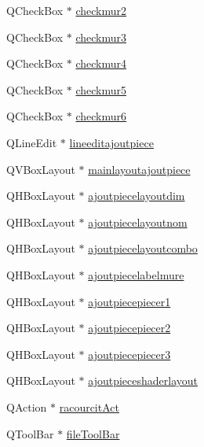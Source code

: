 \begin{DoxyCompactItemize}
\item 
Q\+Check\+Box $\ast$ \hyperlink{class_main_window_a9311b2ff986d09836c8e385348acd571}{checkmur2}
\item 
Q\+Check\+Box $\ast$ \hyperlink{class_main_window_a71169e71f8f50fc126c8cdaad981cad7}{checkmur3}
\item 
Q\+Check\+Box $\ast$ \hyperlink{class_main_window_a2e8fae74cfc9045da4dfcba506aacca4}{checkmur4}
\item 
Q\+Check\+Box $\ast$ \hyperlink{class_main_window_a13b9eb7874b1b8363eb8ee0399e0a6db}{checkmur5}
\item 
Q\+Check\+Box $\ast$ \hyperlink{class_main_window_a0e9dad3f68b376acacd166f6a58ea4dd}{checkmur6}
\item 
Q\+Line\+Edit $\ast$ \hyperlink{class_main_window_ac6b2333b54d4551f41d0941c7f171097}{lineeditajoutpiece}
\item 
Q\+V\+Box\+Layout $\ast$ \hyperlink{class_main_window_a9c7efc08e16b1648f53664b98dc99c00}{mainlayoutajoutpiece}
\item 
Q\+H\+Box\+Layout $\ast$ \hyperlink{class_main_window_ae06a728d54678994456d0585d265baf0}{ajoutpiecelayoutdim}
\item 
Q\+H\+Box\+Layout $\ast$ \hyperlink{class_main_window_a48cf0bbc5e90a751711519a7c7c2af7b}{ajoutpiecelayoutnom}
\item 
Q\+H\+Box\+Layout $\ast$ \hyperlink{class_main_window_a195ed8cd075a1153faa7926f38b08609}{ajoutpiecelayoutcombo}
\item 
Q\+H\+Box\+Layout $\ast$ \hyperlink{class_main_window_a7fc456fae07aba46102c8670721688e6}{ajoutpiecelabelmure}
\item 
Q\+H\+Box\+Layout $\ast$ \hyperlink{class_main_window_a49e6b8184f85caeec9b9936999387e8f}{ajoutpiecepiecer1}
\item 
Q\+H\+Box\+Layout $\ast$ \hyperlink{class_main_window_a01a7211a86eb47e523b13d18beedd7c5}{ajoutpiecepiecer2}
\item 
Q\+H\+Box\+Layout $\ast$ \hyperlink{class_main_window_ac059f285df8d02b2deaf915f82c4c247}{ajoutpiecepiecer3}
\item 
Q\+H\+Box\+Layout $\ast$ \hyperlink{class_main_window_aace055ea8d65d6138d60d7a40da1c707}{ajoutpieceshaderlayout}
\item 
Q\+Action $\ast$ \hyperlink{class_main_window_a5abf7bab9a2c85168545220c9984fdfe}{racourcit\+Act}
\item 
Q\+Tool\+Bar $\ast$ \hyperlink{class_main_window_a0a352c6d66b7a080fcf558874a7e51d4}{file\+Tool\+Bar}
\item 

\end{DoxyCompactItemize}
